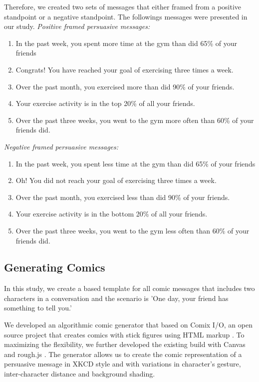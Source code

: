 Therefore, we created two sets of messages that either framed from a positive standpoint or a negative standpoint. The followings messages were presented in our study.
\textit{Positive framed persuasive messages:}
\begin{enumerate}
 \item In the past week, you spent more time at the gym than did 65\% of your friends
 \item Congrats! You have reached your goal of exercising three times a week.
 \item Over the past month, you exercised more than did 90\% of your friends.
 \item Your exercise activity is in the top 20\% of all your friends.
 \item Over the past three weeks, you went to the gym more often than 60\% of your friends did.
\end{enumerate}\par
\textit{Negative framed persuasive messages:}
\begin{enumerate}
 \item	In the past week, you spent less time at the gym than did 65\% of your friends
 \item  Oh! You did not reach your goal of exercising three times a week.
 \item	Over the past month, you exercised less than did 90\% of your friends.
 \item	Your exercise activity is in the bottom 20\% of all your friends.
 \item	Over the past three weeks, you went to the gym less often than 60\% of your friends did.
\end{enumerate}

\subsection{Generating Comics}
In this study, we create a based template for all comic messages that includes two characters in a conversation and the scenario is 'One day, your friend has something to tell you.'\par

We developed an algorithmic comic generator that based on Comix I/O, an open source project that creates comics with stick figures using HTML markup \cite{cmx.io}. To maximizing the flexibility, we further developed the existing build with Canvas and rough.js \cite{canvasjs,rough.js}. The generator allows us to create the comic representation of a persuasive message in XKCD style \cite{munroe2009xkcd} and with variations in character's gesture, inter-character distance and background shading.\par

